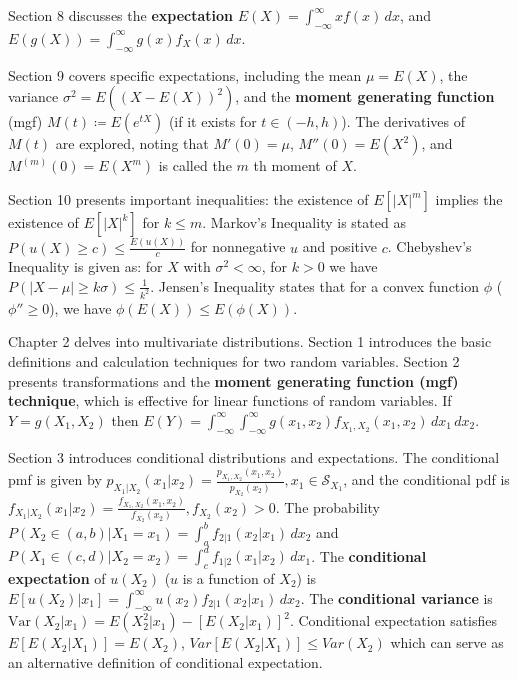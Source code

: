 Section 8 discusses the \textbf{expectation} $E(X)=\int_{-\infty}^{\infty} xf(x) \, dx$, and $E(g(X))=\int_{-\infty}^{\infty} g(x)f_{X}(x) \, dx$.

Section 9 covers specific expectations, including the mean $\mu=E(X)$, the variance $\sigma^{2}=E((X-E(X))^{2})$, and the \textbf{moment generating function} (mgf) $M(t)\coloneqq E(e^{tX})$ (if it exists for $t\in(-h,h)$). The derivatives of $M(t)$ are explored, noting that $M'(0)=\mu$, $M''(0)=E(X^{2})$, and $M^{(m)}(0)=E(X^{m})$ is called the $m$ th moment of $X$.

Section 10 presents important inequalities: the existence of $E[\lvert X \rvert ^{m}]$ implies the existence of $E[\lvert X \rvert ^{k}]$ for $k\leq m$. Markov's Inequality is stated as $P(u(X)\geq c)\leq\frac{E(u(X))}{c}$ for nonnegative $u$ and positive $c$. Chebyshev's Inequality is given as: for $X$ with $\sigma^{2}<\infty$, for $k>0$ we have $P(\lvert X-\mu \rvert\geq k\sigma)\leq\frac{1}{k^{2}}$. Jensen's Inequality states that for a convex function $\phi$ ($\phi''\geq0$), we have $\phi ( E (X))\le E(\phi(X))$.

Chapter 2 delves into multivariate distributions. Section 1 introduces the basic definitions and calculation techniques for two random variables. Section 2 presents transformations and the \textbf{moment generating function (mgf) technique}, which is effective for linear functions of random variables. If $Y=g(X_{1},X_{2})$ then $E(Y)=\int_{-\infty}^{\infty} \int_{-\infty}^{\infty} g(x_{1},x_{2})f_{X_{1},X_{2}}(x_{1},x_{2}) \, dx_{1} \, dx_{2}$.

Section 3 introduces conditional distributions and expectations. The conditional pmf is given by $p_{X_{1}|X_{2}}(x_{1}|x_{2})=\frac{p_{X_{1}, X_{2}}(x_{1}, x_{2})}{p_{X_{2}}(x_{2})}, x_{1}\in \mathcal{S}_{X_{1}}$, and the conditional pdf is $f_{X_{1}|X_{2}}(x_{1}|x_{2})=\frac{f_{X_{1},X_{2}}(x_{1},x_{2})}{f_{X_{2}}(x_{2})},f_{X_{2}}(x_{2})>0$. The probability $P(X_{2}\in(a,b)|X_{1}=x_{1})=\int_{a}^{b} f_{2|1}(x_{2}|x_{1}) \, dx_{2}$ and $P(X_{1}\in(c,d)|X_{2}=x_{2})=\int_{c}^{d} f_{1|2}(x_{1}|x_{2}) \, dx_{1}$. The \textbf{conditional expectation} of $u(X_{2})$ ($u$ is a function of $X_{2}$) is $E[u(X_{2})|x_{1}]=\int_{-\infty}^{\infty} u(x_{2})f_{2|1}(x_{2}|x_{1}) \, dx_{2}$. The \textbf{conditional variance} is $\mathrm{Var}(X_{2}|x_{1})=E(X_{2}^{2}|x_{1})-[E(X_{2}|x_{1})]^{2}$. Conditional expectation satisfies $E[E(X_2|X_1)]=E(X_2)$, $Var[E(X_2|X_1)]\leq Var(X_2)$ which can serve as an alternative definition of conditional expectation.

